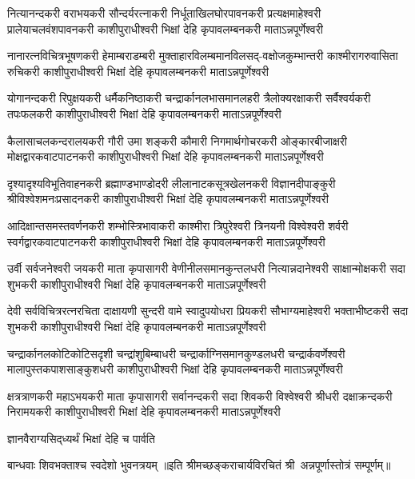 
\fourlineindentedshloka
{नित्यानन्दकरी वराभयकरी सौन्दर्यरत्नाकरी}
{निर्धूताखिलघोरपावनकरी प्रत्यक्षमाहेश्वरी}
{प्रालेयाचलवंशपावनकरी काशीपुराधीश्वरी}
{भिक्षां देहि कृपावलम्बनकरी माताऽन्नपूर्णेश्वरी}

\fourlineindentedshloka
{नानारत्नविचित्रभूषणकरी हेमाम्बराडम्बरी}
{मुक्ताहारविलम्बमानविलसद्-वक्षोजकुम्भान्तरी}
{काश्मीरागरुवासिता रुचिकरी काशीपुराधीश्वरी}
{भिक्षां देहि कृपावलम्बनकरी माताऽन्नपूर्णेश्वरी}

\fourlineindentedshloka
{योगानन्दकरी रिपुक्षयकरी धर्मैकनिष्ठाकरी}
{चन्द्रार्कानलभासमानलहरी त्रैलोक्यरक्षाकरी}
{सर्वैश्वर्यकरी तपःफलकरी काशीपुराधीश्वरी}
{भिक्षां देहि कृपावलम्बनकरी माताऽन्नपूर्णेश्वरी}

\fourlineindentedshloka
{कैलासाचलकन्दरालयकरी गौरी उमा शङ्करी}
{कौमारी निगमार्थगोचरकरी ओङ्कारबीजाक्षरी}
{मोक्षद्वारकवाटपाटनकरी काशीपुराधीश्वरी}
{भिक्षां देहि कृपावलम्बनकरी माताऽन्नपूर्णेश्वरी}

\fourlineindentedshloka
{दृश्यादृश्यविभूतिवाहनकरी ब्रह्माण्डभाण्डोदरी}
{लीलानाटकसूत्रखेलनकरी विज्ञानदीपाङ्कुरी}
{श्रीविश्वेशमनःप्रसादनकरी काशीपुराधीश्वरी}
{भिक्षां देहि कृपावलम्बनकरी माताऽन्नपूर्णेश्वरी}

\fourlineindentedshloka
{आदिक्षान्तसमस्तवर्णनकरी शम्भोस्त्रिभावाकरी}
{काश्मीरा त्रिपुरेश्वरी त्रिनयनी विश्वेश्वरी शर्वरी}
{स्वर्गद्वारकवाटपाटनकरी काशीपुराधीश्वरी}
{भिक्षां देहि कृपावलम्बनकरी माताऽन्नपूर्णेश्वरी}

\fourlineindentedshloka
{उर्वी सर्वजनेश्वरी जयकरी माता कृपासागरी}
{वेणीनीलसमानकुन्तलधरी नित्यान्नदानेश्वरी}
{साक्षान्मोक्षकरी सदा शुभकरी काशीपुराधीश्वरी}
{भिक्षां देहि कृपावलम्बनकरी माताऽन्नपूर्णेश्वरी}

\fourlineindentedshloka
{देवी सर्वविचित्ररत्नरचिता दाक्षायणी सुन्दरी}
{वामे स्वादुपयोधरा प्रियकरी सौभाग्यमाहेश्वरी}
{भक्ताभीष्टकरी सदा शुभकरी काशीपुराधीश्वरी}
{भिक्षां देहि कृपावलम्बनकरी माताऽन्नपूर्णेश्वरी}

\fourlineindentedshloka
{चन्द्रार्कानलकोटिकोटिसदृशी चन्द्रांशुबिम्बाधरी}
{चन्द्रार्काग्निसमानकुण्डलधरी चन्द्रार्कवर्णेश्वरी}
{मालापुस्तकपाशसाङ्कुशधरी काशीपुराधीश्वरी}
{भिक्षां देहि कृपावलम्बनकरी माताऽन्नपूर्णेश्वरी}

\fourlineindentedshloka
{क्षत्रत्राणकरी महाऽभयकरी माता कृपासागरी}
{सर्वानन्दकरी सदा शिवकरी विश्वेश्वरी श्रीधरी}
{दक्षाक्रन्दकरी निरामयकरी काशीपुराधीश्वरी}
{भिक्षां देहि कृपावलम्बनकरी माताऽन्नपूर्णेश्वरी}

{ज्ञानवैराग्यसिद्‌ध्यर्थं भिक्षां देहि च पार्वति}

{बान्धवाः शिवभक्ताश्च स्वदेशो भुवनत्रयम्}
॥इति  श्रीमच्छङ्कराचार्यविरचितं श्री~अन्नपूर्णास्तोत्रं सम्पूर्णम्॥